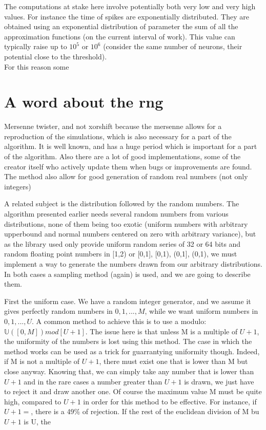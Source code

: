 	The computations at stake here involve potentially both very low and very high values. For instance the time of spikes are exponentially distributed. They are obtained using an exponential distribution of parameter the sum of all the approximation functions (on the current interval of work). This value can typically raise up to $10^5$ or $10^6$ (consider the same number of neurons, their potential close to the threshold).\\

	For this reason some 

\section{A word about the rng}
	Mersenne twister, and not xorshift because the mersenne allows for a reproduction of the simulations, which is also necessary for a part of the algorithm. It is well known, and has a huge period which is important for a part of the algorithm. Also there are a lot of good implementations, some of the creator itself who actively update them when bugs or improvements are found. The method also allow for good generation of random real numbers (not only integers)

	A related subject is the distribution followed by the random numbers. The algorithm presented earlier needs several random numbers from various distributions, none of them being too exotic (uniform numbers with arbitrary upperbound and normal numbers centered on zero with arbitrary variance), but as the library used only provide uniform random series of 32 or 64 bits and random floating point numbers in [1,2) or {[0,1], [0,1), (0,1], (0,1)}, we must implement a way to generate the numbers drawn from our arbitrary distributions. In both cases a sampling method (again) is used, and we are going to describe them.

	First the uniform case. We have a random integer generator, and we assume it gives perfectly random numbers in $ {0, 1, ..., M} $, while we want uniform numbers in $ {0, 1, ..., U} $. A common method to achieve this is to use a modulo: $ \mathbb{U}([0, M]) mod[U+1] $. The issue here is that unless M is a multiple of $ U+1 $, the uniformity of the numbers is lost using this method. The case in which the method works can be used as a trick for guarrantying uniformity though. Indeed, if M is not a multiple of $ U+1 $, there must exist one that is lower than M but close anyway. Knowing that, we can simply take any number that is lower than $ U+1 $ and in the rare cases a number greater than $ U+1 $ is drawn, we just have to reject it and draw another one. Of course the maximum value M must be quite high, compared to $ U+1 $ in order for this method to be effective. For instance, if $ U+1= $, there is a 49\% of rejection. If the rest of the euclidean division of M bu $ U+1 $ is U, the 

	
	
	